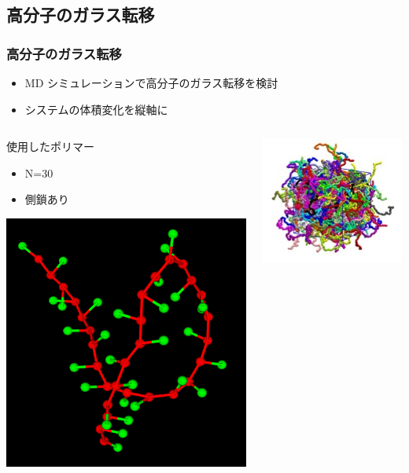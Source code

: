 \documentclass[unicode,12pt]{beamer}%
\begin{document}
\subsection{高分子のガラス転移}
\begin{frame}
	\frametitle{高分子のガラス転移}
	\begin{itemize}
		\item MD シミュレーションで高分子のガラス転移を検討
		\item システムの体積変化を縦軸に
	\end{itemize}
	
	\vspace{-3mm}
	\begin{columns}[t, onlytextwidth]
			\begin{block}{使用したポリマー}
				\begin{itemize}
					\item N=30
					\item 側鎖あり
				\end{itemize}
				\centering
				\includegraphics[width=.7\textwidth]{N30_wSC1_single.png}
			\end{block}
		\begin{center}
			\centering
			\includegraphics[width=.4\textwidth]{polymer_image2.png}


\end{center}
\end{columns}
\end{frame}
\end{document}
